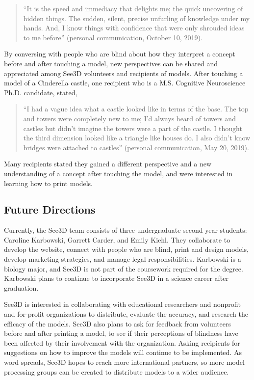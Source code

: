 \documentclass[11.5pt]{sig-alternate} %
\begin{document}
\begin{large}
\begin{quote}
“It is the speed and immediacy that delights me; the quick uncovering of hidden things. The sudden, silent, precise unfurling of knowledge under my hands. And, I know things with confidence that were only shrouded ideas to me before” (personal communication, October 10, 2019).
\end{quote}

By conversing with people who are blind about how they interpret a concept before and after touching a model, new perspectives can be shared and appreciated among See3D volunteers and recipients of models. After touching a model of a Cinderella castle, one recipient who is a M.S. Cognitive Neuroscience Ph.D. candidate, stated,

\begin{quote}
“I had a vague idea what a castle looked like in terms of the base. The top and towers were completely new to me; I'd always heard of towers and castles but didn't imagine the towers were a part of the castle. I thought the third dimension looked like a triangle like houses do. I also didn't know bridges were attached to castles” (personal communication, May 20, 2019).
\end{quote}

Many recipients stated they gained a different perspective and a new understanding of a concept after touching the model, and were interested in learning how to print models. 

\subsection*{Future Directions}

Currently, the See3D team consists of three undergraduate second-year students: Caroline Karbowski, Garrett Carder, and Emily Kiehl. They collaborate to develop the website, connect with people who are blind, print and design models, develop marketing strategies, and manage legal responsibilities. Karbowski is a biology major, and See3D is not part of the coursework required for the degree. Karbowski plans to continue to incorporate See3D in a science career after graduation.   

See3D is interested in collaborating with educational researchers and nonprofit and for-profit organizations to distribute, evaluate the accuracy, and research the efficacy of the models. See3D also plans to ask for feedback from volunteers before and after printing a model, to see if their perceptions of blindness have been affected by their involvement with the organization. Asking recipients for suggestions on how to improve the models will continue to be implemented. As word spreads, See3D hopes to reach more international partners, so more model processing groups can be created to distribute models to a wider audience. 


\end{large}
\end{document}

